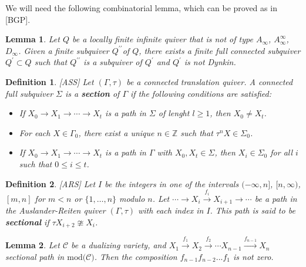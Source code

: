 \documentclass{amsart}
\theoremstyle{plain}
\newtheorem{definition}{Definition}
\newtheorem{lemma}{Lemma}
\numberwithin{equation}{section}
\begin{document}
We will need the following combinatorial lemma, which can be proved as in
[BGP].

\begin{lemma}
\label{Dinher} Let $Q$ be a locally finite infinite quiver that is not of
type $A_{\infty }$, $A_{\infty }^{\infty }$, $D_{\infty }$. Given a finite
subquiver $Q^{\prime \prime }$of $Q$, there exists a finite full connected
subquiver $Q^{\prime }\subset Q$ such that $Q^{\prime \prime }$ is a
subquiver of $Q^{\prime }$ and $Q^{\prime }$ is not Dynkin.
\end{lemma}

\begin{definition}
\emph{[ASS]} Let $(\Gamma ,\tau )$ be a connected translation quiver. A
connected full subquiver $\Sigma $ is a \textbf{section} of $\Gamma $ if the
following conditions are satisfied:

\begin{itemize}
\item[(S1)] If $X_{0}\rightarrow X_{1}\rightarrow \cdots \rightarrow X_{t}$
is a path in $\Sigma $ of lenght $l\geq 1$, then $X_{0}\neq X_{t}$.

\item[(S2)] For each $X\in\Gamma_0$, there exist a unique $n\in\mathbb{Z}$
such that $\tau^n X\in\Sigma_0$.

\item[(S3)] If $X_0\rightarrow X_1\rightarrow \cdots\rightarrow X_t$ is a
path in $\Gamma$ with $X_0,X_t\in\Sigma$, then $X_i\in\Sigma_0$ for all $i$
such that $0\le i\le t$.
\end{itemize}
\end{definition}

\begin{definition}
\emph{[ARS]} Let $I$ be the integers in one of the intervals $(-\infty,n]$, $[n,\infty)$, $[m,n]$ for $m<n$ or $\{1,\ldots,n\}$ modulo $n$. Let $\cdots\rightarrow X_i\xrightarrow{f_i}X_{i+1}\rightarrow \cdots$ be a path
in the Auslander-Reiten quiver $(\Gamma,\tau)$ with each index in $I$. This
path is said to be \textbf{sectional} if $\tau X_{i+2}\ncong X_i$.
\end{definition}

\begin{lemma}
Let $\mathcal{C}$ be a dualizing variety, and $X_{1}\overset{f_{1}}{\rightarrow }X_{2}\overset{f_{2}}{\rightarrow }\cdots X_{n-1}\overset{f_{n-1}}{\rightarrow }X_{n}$ sectional path in $\mathrm{mod}(\mathcal{C)}$. Then
the composition $f_{n-1}f_{n-2}...f_{1}$ is not zero.
\end{lemma}
\end{document}
